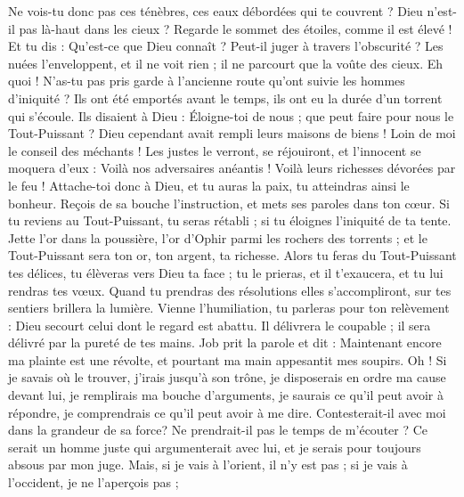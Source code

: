 \begin{multicols}{2}
Ne vois-tu donc pas ces ténèbres, ces eaux débordées qui te couvrent ?
Dieu n'est-il pas là-haut dans les cieux ? Regarde le sommet des étoiles, comme il est élevé !
Et tu dis : Qu'est-ce que Dieu connaît ? Peut-il juger à travers l'obscurité ?
Les nuées l'enveloppent, et il ne voit rien ; il ne parcourt que la voûte des cieux.
Eh quoi ! N'as-tu pas pris garde à l'ancienne route qu'ont suivie les hommes d'iniquité ?
Ils ont été emportés avant le temps, ils ont eu la durée d'un torrent qui s'écoule.
Ils disaient à Dieu : Éloigne-toi de nous ; que peut faire pour nous le Tout-Puissant ?
Dieu cependant avait rempli leurs maisons de biens ! Loin de moi le conseil des méchants !
Les justes le verront, se réjouiront, et l'innocent se moquera d'eux :
Voilà nos adversaires anéantis ! Voilà leurs richesses dévorées par le feu !
Attache-toi donc à Dieu, et tu auras la paix, tu atteindras ainsi le bonheur.
Reçois de sa bouche l'instruction, et mets ses paroles dans ton cœur.
Si tu reviens au Tout-Puissant, tu seras rétabli ; si tu éloignes l'iniquité de ta tente.
Jette l'or dans la poussière, l'or d'Ophir parmi les rochers des torrents ;
et le Tout-Puissant sera ton or, ton argent, ta richesse.
Alors tu feras du Tout-Puissant tes délices, tu élèveras vers Dieu ta face ;
tu le prieras, et il t'exaucera, et tu lui rendras tes vœux.
Quand tu prendras des résolutions elles s'accompliront, sur tes sentiers brillera la lumière.
Vienne l'humiliation, tu parleras pour ton relèvement : Dieu secourt celui dont le regard est abattu.
Il délivrera le coupable ; il sera délivré par la pureté de tes mains.
\VerseOne{}Job prit la parole et dit :
Maintenant encore ma plainte est une révolte, et pourtant ma main appesantit mes soupirs.
Oh ! Si je savais où le trouver, j'irais jusqu'à son trône,
je disposerais en ordre ma cause devant lui, je remplirais ma bouche d'arguments,
je saurais ce qu'il peut avoir à répondre, je comprendrais ce qu'il peut avoir à me dire.
Contesterait-il avec moi dans la grandeur de sa force? Ne prendrait-il pas le temps de m'écouter ?
Ce serait un homme juste qui argumenterait avec lui, et je serais pour toujours absous par mon juge.
Mais, si je vais à l'orient, il n'y est pas ; si je vais à l'occident, je ne l'aperçois pas ;

\end{multicols}
